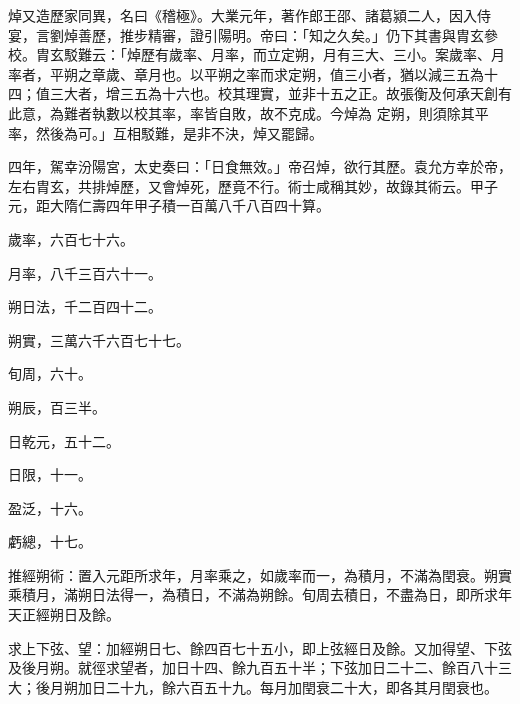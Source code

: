 \begin{pinyinscope}
 焯又造歷家同異，名曰《稽極》。大業元年，著作郎王邵、諸葛潁二人，因入侍宴，言劉焯善歷，推步精審，證引陽明。帝曰：「知之久矣。」仍下其書與胄玄參校。胄玄駁難云：「焯歷有歲率、月率，而立定朔，月有三大、三小。案歲率、月率者，平朔之章歲、章月也。以平朔之率而求定朔，值三小者，猶以減三五為十四；值三大者，增三五為十六也。校其理實，並非十五之正。故張衡及何承天創有此意，為難者執數以校其率，率皆自敗，故不克成。今焯為
 定朔，則須除其平率，然後為可。」互相駁難，是非不決，焯又罷歸。



 四年，駕幸汾陽宮，太史奏曰：「日食無效。」帝召焯，欲行其歷。袁允方幸於帝，左右胄玄，共排焯歷，又會焯死，歷竟不行。術士咸稱其妙，故錄其術云。甲子元，距大隋仁壽四年甲子積一百萬八千八百四十算。



 歲率，六百七十六。



 月率，八千三百六十一。



 朔日法，千二百四十二。



 朔實，三萬六千六百七十七。



 旬周，六十。



 朔辰，百三半。



 日乾元，五十二。



 日限，十一。



 盈泛，十六。



 虧總，十七。



 推經朔術：置入元距所求年，月率乘之，如歲率而一，為積月，不滿為閏衰。朔實乘積月，滿朔日法得一，為積日，不滿為朔餘。旬周去積日，不盡為日，即所求年天正經朔日及餘。



 求上下弦、望：加經朔日七、餘四百七十五小，即上弦經日及餘。又加得望、下弦及後月朔。就徑求望者，加日十四、餘九百五十半；下弦加日二十二、餘百八十三大；後月朔加日二十九，餘六百五十九。每月加閏衰二十大，即各其月閏衰也。




\end{pinyinscope}
